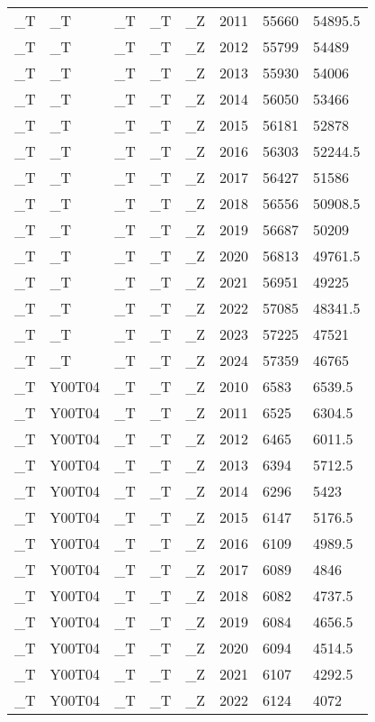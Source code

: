 \begin{longtable}[t]{llllllll}
\_T & \_T & \_T & \_T & \_Z & 2011 & 55660 & 54895.5\\
\_T & \_T & \_T & \_T & \_Z & 2012 & 55799 & 54489\\
\_T & \_T & \_T & \_T & \_Z & 2013 & 55930 & 54006\\
\_T & \_T & \_T & \_T & \_Z & 2014 & 56050 & 53466\\
\addlinespace
\_T & \_T & \_T & \_T & \_Z & 2015 & 56181 & 52878\\
\_T & \_T & \_T & \_T & \_Z & 2016 & 56303 & 52244.5\\
\_T & \_T & \_T & \_T & \_Z & 2017 & 56427 & 51586\\
\_T & \_T & \_T & \_T & \_Z & 2018 & 56556 & 50908.5\\
\_T & \_T & \_T & \_T & \_Z & 2019 & 56687 & 50209\\
\addlinespace
\_T & \_T & \_T & \_T & \_Z & 2020 & 56813 & 49761.5\\
\_T & \_T & \_T & \_T & \_Z & 2021 & 56951 & 49225\\
\_T & \_T & \_T & \_T & \_Z & 2022 & 57085 & 48341.5\\
\_T & \_T & \_T & \_T & \_Z & 2023 & 57225 & 47521\\
\_T & \_T & \_T & \_T & \_Z & 2024 & 57359 & 46765\\
\addlinespace
\_T & Y00T04 & \_T & \_T & \_Z & 2010 & 6583 & 6539.5\\
\_T & Y00T04 & \_T & \_T & \_Z & 2011 & 6525 & 6304.5\\
\_T & Y00T04 & \_T & \_T & \_Z & 2012 & 6465 & 6011.5\\
\_T & Y00T04 & \_T & \_T & \_Z & 2013 & 6394 & 5712.5\\
\_T & Y00T04 & \_T & \_T & \_Z & 2014 & 6296 & 5423\\
\addlinespace
\_T & Y00T04 & \_T & \_T & \_Z & 2015 & 6147 & 5176.5\\
\_T & Y00T04 & \_T & \_T & \_Z & 2016 & 6109 & 4989.5\\
\_T & Y00T04 & \_T & \_T & \_Z & 2017 & 6089 & 4846\\
\_T & Y00T04 & \_T & \_T & \_Z & 2018 & 6082 & 4737.5\\
\_T & Y00T04 & \_T & \_T & \_Z & 2019 & 6084 & 4656.5\\
\addlinespace
\_T & Y00T04 & \_T & \_T & \_Z & 2020 & 6094 & 4514.5\\
\_T & Y00T04 & \_T & \_T & \_Z & 2021 & 6107 & 4292.5\\
\_T & Y00T04 & \_T & \_T & \_Z & 2022 & 6124 & 4072\\

\end{longtable}
